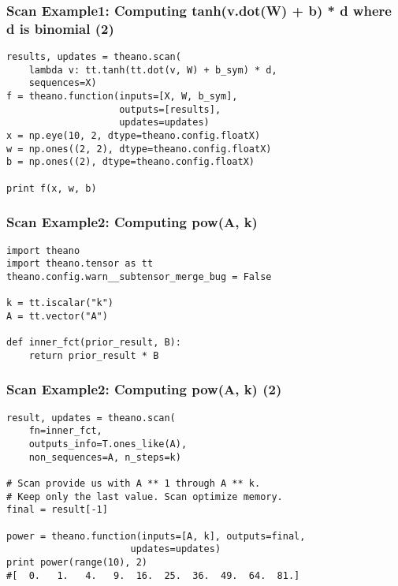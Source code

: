 \documentclass[utf8x,xcolor=pdftex,dvipsnames,table]{beamer}
\begin{document}
\begin{frame}[fragile]
  \frametitle{Scan Example1: Computing tanh(v.dot(W) + b) * d where d is binomial (2)}

\begin{lstlisting}
results, updates = theano.scan(
    lambda v: tt.tanh(tt.dot(v, W) + b_sym) * d,
    sequences=X)
f = theano.function(inputs=[X, W, b_sym],
                    outputs=[results],
                    updates=updates)
x = np.eye(10, 2, dtype=theano.config.floatX)
w = np.ones((2, 2), dtype=theano.config.floatX)
b = np.ones((2), dtype=theano.config.floatX)

print f(x, w, b)
\end{lstlisting}
\end{frame}

\begin{frame}[fragile]
  \frametitle{Scan Example2: Computing pow(A, k)}

\begin{lstlisting}
import theano
import theano.tensor as tt
theano.config.warn__subtensor_merge_bug = False

k = tt.iscalar("k")
A = tt.vector("A")

def inner_fct(prior_result, B):
    return prior_result * B
\end{lstlisting}
\end{frame}

\begin{frame}[fragile]
  \frametitle{Scan Example2: Computing pow(A, k) (2)}

\begin{lstlisting}
result, updates = theano.scan(
    fn=inner_fct,
    outputs_info=T.ones_like(A),
    non_sequences=A, n_steps=k)

# Scan provide us with A ** 1 through A ** k.
# Keep only the last value. Scan optimize memory.
final = result[-1]

power = theano.function(inputs=[A, k], outputs=final,
                      updates=updates)
print power(range(10), 2)
#[  0.   1.   4.   9.  16.  25.  36.  49.  64.  81.]
\end{lstlisting}
\end{frame}
\end{document}
